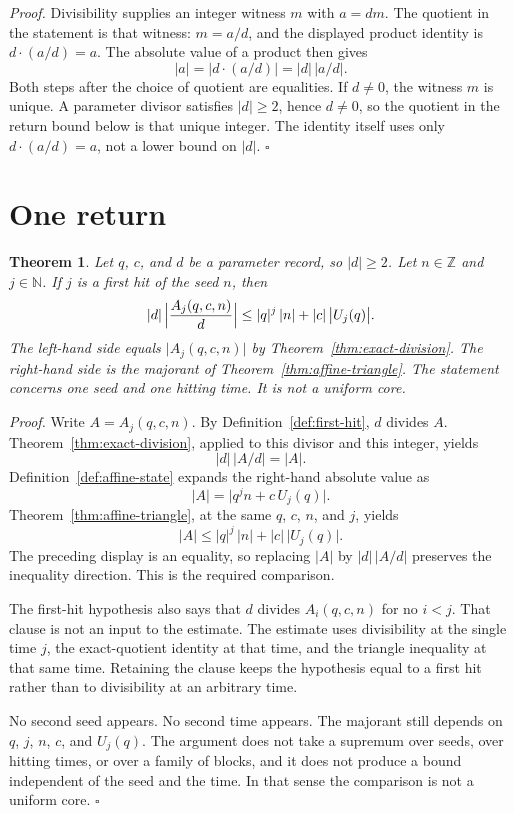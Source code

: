 \documentclass[11pt,letterpaper]{article}
\newcommand{\N}{\mathbb{N}}
\newcommand{\Z}{\mathbb{Z}}
\newtheorem{theorem}{Theorem}
\newenvironment{proof}{\noindent\textit{Proof.}}{\hfill\(\square\)}
\begin{document}
\begin{proof}
Divisibility supplies an integer witness \(m\) with \(a=dm\). The quotient in
the statement is that witness: \(m=a/d\), and the displayed product identity
is \(d\cdot(a/d)=a\). The absolute value of a product then gives
\[
|a|=|d\cdot(a/d)|=|d|\,\bigl|a/d\bigr|.
\]
Both steps after the choice of quotient are equalities. If \(d\neq 0\), the
witness \(m\) is unique. A parameter divisor satisfies \(|d|\ge 2\), hence
\(d\neq 0\), so the quotient in the return bound below is that unique integer.
The identity itself uses only \(d\cdot(a/d)=a\), not a lower bound on \(|d|\).
\end{proof}

\section{One return}

\begin{theorem}
\label{thm:return-magnitude}
Let \(q\), \(c\), and \(d\) be a parameter record, so \(|d|\ge 2\). Let
\(n\in\Z\) and \(j\in\N\). If \(j\) is a first hit of the seed \(n\), then
\[
|d|\,\Bigl|\frac{A_{j}(q,c,n)}{d}\Bigr|
\le |q|^{j}\,|n|+|c|\,\bigl|U_{j}(q)\bigr|.
\]
The left-hand side equals \(\bigl|A_{j}(q,c,n)\bigr|\) by
Theorem~\ref{thm:exact-division}. The right-hand side is the majorant of
Theorem~\ref{thm:affine-triangle}. The statement concerns one seed and one
hitting time. It is not a uniform core.
\end{theorem}

\begin{proof}
Write \(A=A_{j}(q,c,n)\). By Definition~\ref{def:first-hit}, \(d\) divides
\(A\). Theorem~\ref{thm:exact-division}, applied to this divisor and this
integer, yields
\[
|d|\,\bigl|A/d\bigr|=|A|.
\]
Definition~\ref{def:affine-state} expands the right-hand absolute value as
\[
|A|=\bigl|q^{j}n+c\,U_{j}(q)\bigr|.
\]
Theorem~\ref{thm:affine-triangle}, at the same \(q\), \(c\), \(n\), and \(j\),
yields
\[
|A|\le |q|^{j}\,|n|+|c|\,\bigl|U_{j}(q)\bigr|.
\]
The preceding display is an equality, so replacing \(|A|\) by
\(|d|\,\bigl|A/d\bigr|\) preserves the inequality direction. This is the
required comparison.

The first-hit hypothesis also says that \(d\) divides \(A_{i}(q,c,n)\) for no
\(i<j\). That clause is not an input to the estimate. The estimate uses
divisibility at the single time \(j\), the exact-quotient identity at that
time, and the triangle inequality at that same time. Retaining the clause
keeps the hypothesis equal to a first hit rather than to divisibility at an
arbitrary time.

No second seed appears. No second time appears. The majorant still depends on
\(q\), \(j\), \(n\), \(c\), and \(U_{j}(q)\). The argument does not take a
supremum over seeds, over hitting times, or over a family of blocks, and it
does not produce a bound independent of the seed and the time. In that sense
the comparison is not a uniform core.
\end{proof}
\end{document}
